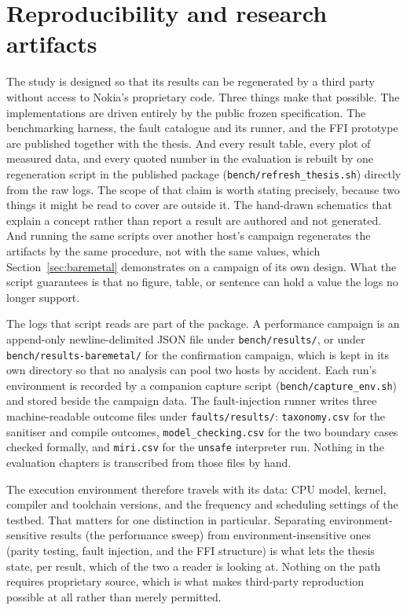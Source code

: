\documentclass[english,oneside,a4paper,censored,csm,software-track-2020]{HYthesisML}
\begin{document}
\section{Reproducibility and research artifacts}\label{sec:repro}
The study is designed so that its results can be regenerated by a third party without access to
Nokia's proprietary code. Three things make that possible. The implementations are driven
entirely by the public frozen specification. The benchmarking harness, the fault catalogue and
its runner, and the FFI prototype are published together with the thesis. And every result table,
every plot of measured data, and every quoted number in the evaluation is rebuilt by one
regeneration script in the published package (\texttt{bench/refresh\_thesis.sh}) directly from the
raw logs. The scope of that claim is worth stating precisely, because two things it might be read to
cover are outside it. The hand-drawn schematics that explain a concept rather than report a result
are authored and not generated. And running the same scripts over another host's campaign
regenerates the artifacts by the same procedure, not with the same values, which
Section~\ref{sec:baremetal} demonstrates on a campaign of its own design. What the script
guarantees is that no figure, table, or sentence can hold a value the logs no longer support.

The logs that script reads are part of the package. A performance campaign is an append-only
newline-delimited JSON file under \texttt{bench/results/}, or under
\texttt{bench/results-baremetal/} for the confirmation campaign, which is kept in its own directory
so that no analysis can pool two hosts by accident. Each run's environment is recorded by
a companion capture script (\texttt{bench/capture\_env.sh}) and stored beside the campaign data.
The fault-injection runner writes three machine-readable outcome files under
\texttt{faults/results/}: \texttt{taxonomy.csv} for the sanitiser and compile outcomes,
\texttt{model\_checking.csv} for the two boundary cases checked formally, and \texttt{miri.csv}
for the \texttt{unsafe} interpreter run. Nothing in the evaluation chapters is transcribed from
those files by hand.

The execution environment therefore travels with its data: CPU model, kernel, compiler and
toolchain versions, and the frequency and scheduling settings of the
testbed. That matters for one
distinction in particular. Separating environment-sensitive results (the performance sweep) from
environment-insensitive ones (parity testing, fault injection, and the FFI structure) is what
lets the thesis state, per result, which of the two a reader is looking at. Nothing on the path
requires proprietary source, which is what makes third-party reproduction possible at all rather
than merely permitted.
\end{document}
